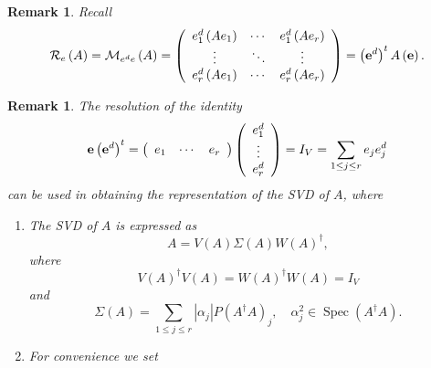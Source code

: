 \documentclass[aps,preprint]{revtex4}%
\newtheorem{remark}[theorem]{Remark}
\begin{document}
\begin{remark}
Recall
\begin{equation}
\mathcal{R}_{e}\left(  A\right)  =\mathcal{M}_{e^{d}e}\left(  A\right)
=\left(
\begin{array}
[c]{ccc}%
e_{1}^{d}\left(  Ae_{1}\right)  & \cdots & e_{1}^{d}\left(  Ae_{r}\right) \\
\vdots & \ddots & \vdots\\
e_{r}^{d}\left(  Ae_{1}\right)  & \cdots & e_{r}^{d}\left(  Ae_{r}\right)
\end{array}
\right)  =\left(  \mathbf{e}^{d}\right)  ^{t}A\left(  \mathbf{e}\right)
\mathbf{.}%
\end{equation}

\end{remark}

\begin{remark}
The resolution of the identity
\begin{equation}
\mathbf{e}\left(  \mathbf{e}^{d}\right)  ^{t}=\left(
\begin{array}
[c]{ccc}%
e_{1} & \cdots & e_{r}%
\end{array}
\right)  \left(
\begin{array}
[c]{c}%
e_{1}^{d}\\
\vdots\\
e_{r}^{d}%
\end{array}
\right)  =I_{V}=\sum_{1\leq j\leq r}e_{j}e_{j}^{d}%
\end{equation}
can be used in obtaining the representation of the SVD of $A$, where

\begin{enumerate}
\item The SVD of $A$ is expressed as
\begin{equation}
A=V\left(  A\right)  \Sigma\left(  A\right)  W\left(  A\right)  ^{\dagger},
\end{equation}
where
\begin{equation}
V\left(  A\right)  ^{\dagger}V\left(  A\right)  =W\left(  A\right)  ^{\dagger
}W\left(  A\right)  =I_{V}%
\end{equation}
and
\begin{equation}
\Sigma\left(  A\right)  =\sum_{1\leq j\leq r}\left\vert \alpha_{j}\right\vert
P\left(  A^{\dagger}A\right)  _{j},\quad\alpha_{j}^{2}\in\operatorname*{Spec}%
\left(  A^{\dagger}A\right)  .
\end{equation}


\item For convenience we set


\end{enumerate}
\end{remark}
\end{document}
